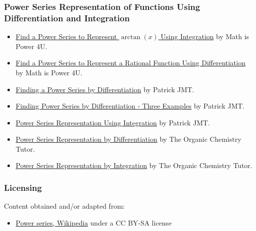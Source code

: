 \subsubsection{Power Series Representation of Functions Using Differentiation and Integration}
\label{sss:powe-4b59}

\begin{itemize}
\item \href{https://www.youtube.com/watch?v=bvNPmQRY8Ts}{Find a Power Series to Represent $\arctan(x)$ Using Integration} by Math is Power 4U.
\item \href{https://www.youtube.com/watch?v=ujB-5zQWZAY}{Find a Power Series to Represent a Rational Function Using Differentiation} by Math is Power 4U.
\item \href{https://www.youtube.com/watch?v=JCF3jgmsJuY}{Finding a Power Series by Differentiation} by Patrick JMT.
\item \href{https://www.youtube.com/watch?v=fLJsUpZnt1M}{Finding Power Series by Differentiation - Three Examples} by Patrick JMT.
\item \href{https://www.youtube.com/watch?v=L9xrmXtmMcA}{Power Series Representation Using Integration} by Patrick JMT.
\item \href{https://www.youtube.com/watch?v=PmHaNjDBh_c}{Power Series Representation by Differentiation} by The Organic Chemistry Tutor.
\item \href{https://www.youtube.com/watch?v=0HyM3nM87mk}{Power Series Representation by Integration} by The Organic Chemistry Tutor.
\end{itemize}

\subsubsection{Licensing}
\label{sss:lice-7352}


Content obtained and/or adapted from:


\begin{itemize}
    \item \href{https://en.wikipedia.org/wiki/Power_series}{Power series, Wikipedia} under a CC BY-SA license
\end{itemize}

